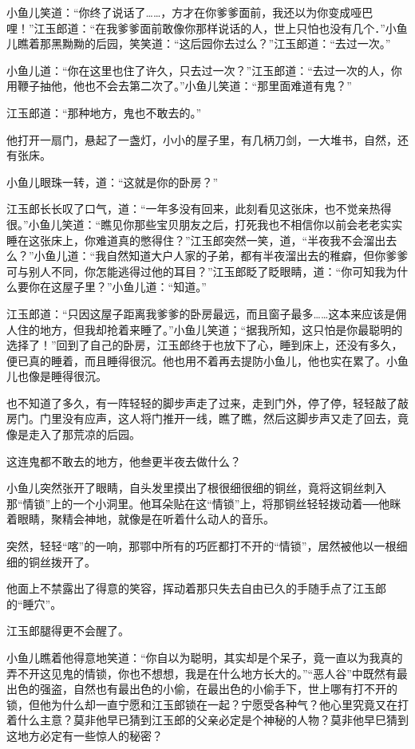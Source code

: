 \documentclass[12pt,oneside]{book}
\begin{document}
小鱼儿笑道：``你终了说话了\ldots\ldots，方才在你爹爹面前，我还以为你变成哑巴哩！''江玉郎道：``在我爹爹面前敢像你那样说话的人，世上只怕也没有几个．''小鱼儿瞧着那黑黝黝的后园，笑笑道：``这后园你去过么？''江玉郎道：``去过一次。''

小鱼儿道：``你在这里也住了许久，只去过一次？''江玉郎道：``去过一次的人，你用鞭子抽他，他也不会去第二次了。''小鱼儿笑道：``那里面难道有鬼？''

江玉郎道：``那种地方，鬼也不敢去的。''

他打开一扇门，悬起了一盏灯，小小的屋子里，有几柄刀剑，一大堆书，自然，还有张床。

小鱼儿眼珠一转，道：``这就是你的卧房？''

江玉郎长长叹了口气，道：``一年多没有回来，此刻看见这张床，也不觉亲热得很。''小鱼儿笑道：``瞧见你那些宝贝朋友之后，打死我也不相信你以前会老老实实睡在这张床上，你难道真的憋得住？''江玉郎突然一笑，道，``半夜我不会溜出去么？''小鱼儿道：``我自然知道大户人家的子弟，都有半夜溜出去的稚癖，但你爹爹可与别人不同，你怎能逃得过他的耳目？''江玉郎眨了眨眼睛，道：``你可知我为什么要你在这屋子里？''小鱼儿道：``知道。''

江玉郎道：``只因这屋子距离我爹爹的卧房最远，而且窗子最多\ldots\ldots 这本来应该是佣人住的地方，但我却抢着来睡了。''小鱼儿笑道；``据我所知，这只怕是你最聪明的选择了！''回到了自己的卧房，江玉郎终于也放下了心，睡到床上，还没有多久，便已真的睡着，而且睡得很沉。他也用不着再去提防小鱼儿，他也实在累了。小鱼儿也像是睡得很沉。

也不知道了多久，有一阵轻轻的脚步声走了过来，走到门外，停了停，轻轻敲了敲房门。门里没有应声，这人将门推开一线，瞧了瞧，然后这脚步声又走了回去，竟像是走入了那荒凉的后园。

这连鬼都不敢去的地方，他叁更半夜去做什么？

小鱼儿突然张开了眼睛，自头发里摸出了根很细很细的铜丝，竟将这铜丝刺入那``情锁''上的一个小洞里。他耳朵贴在这``情锁''上，将那铜丝轻轻拨动着──他眯着眼睛，聚精会神地，就像是在听着什么动人的音乐。

突然，轻轻``喀''的一响，那鄂中所有的巧匠都打不开的``情锁''，居然被他以一根细细的铜丝拨开了。

他面上不禁露出了得意的笑容，挥动着那只失去自由已久的手随手点了江玉郎的``睡穴''。

江玉郎腿得更不会醒了。

小鱼儿瞧着他得意地笑道：``你自以为聪明，其实却是个呆子，竟一直以为我真的弄不开这见鬼的情锁，你也不想想，我是在什么地方长大的。''``恶人谷''中既然有最出色的强盗，自然也有最出色的小偷，在最出色的小偷手下，世上哪有打不开的锁，但他为什么却一直宁愿和江玉郎锁在一起？宁愿受各种气？他心里究竟又在打着什么主意？莫非他早已猜到江玉郎的父亲必定是个神秘的人物？莫非他早巳猜到这地方必定有一些惊人的秘密？
\end{document}

